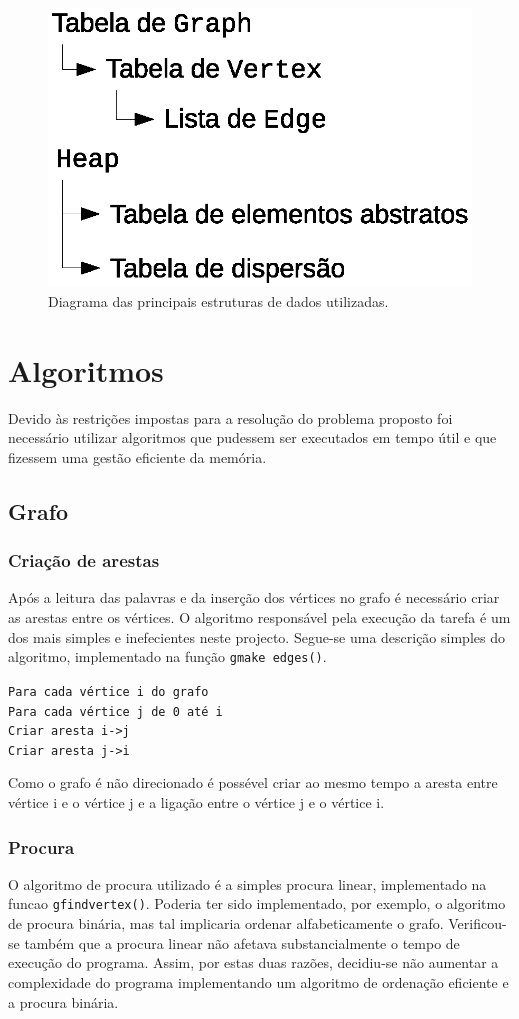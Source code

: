 \documentclass[portuguese, a4paper]{article}
\newcommand\tu[0]{\textunderscore}
\begin{document}
	\begin{figure}[H]
		\centering
		\includegraphics[width=0.4\linewidth]{data}
		\caption{Diagrama das principais estruturas de dados utilizadas.}
	\end{figure}


\section{Algoritmos}
	\par
	Devido às restrições impostas para a resolução do problema proposto foi
	necessário utilizar algoritmos que pudessem ser executados em tempo útil e
	que fizessem uma gestão eficiente da memória.

	\subsection{Grafo}
	\subsubsection{Criação de arestas}
	\par
	Após a leitura das palavras e da inserção dos vértices no grafo é necessário
	criar as arestas entre os vértices. O algoritmo responsável pela execução
	da tarefa é um dos mais simples e inefecientes neste projecto. Segue-se uma
	descrição simples do algoritmo, implementado na função \texttt{g\tu make\tu
	edges()}.

	\par\null\par
	\texttt{Para cada vértice i do grafo}\\
	\indent\indent\texttt{Para cada vértice j de 0 até i}\\
	\indent\indent\indent\texttt{Criar aresta i->j}\\
	\indent\indent\indent\texttt{Criar aresta j->i}\\

	\par
	Como o grafo é não direcionado é possével criar ao mesmo tempo a aresta
	entre vértice i e o vértice j e a ligação entre o vértice j e o vértice i.
	\subsubsection{Procura}
	\par
	O algoritmo de procura utilizado é a simples procura linear, implementado
	na funcao \texttt{g\tu find\tu vertex()}. Poderia ter sido implementado,
	por exemplo, o algoritmo de procura binária, mas tal implicaria ordenar
	alfabeticamente o grafo. Verificou-se também que a procura linear não
	afetava substancialmente o tempo de execução do programa. Assim, por estas
	duas razões, decidiu-se não aumentar a complexidade do programa
	implementando um algoritmo de ordenação eficiente e a procura binária.
\end{document}
